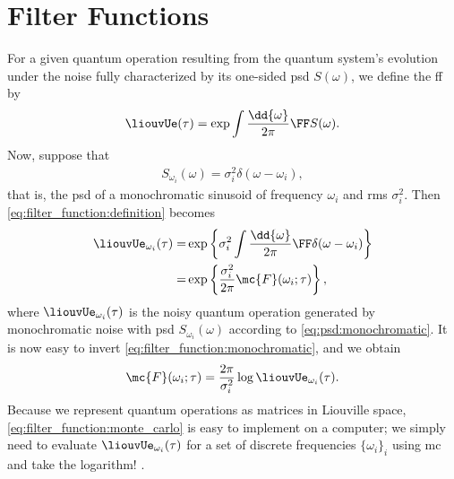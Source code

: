 \chapter{Filter Functions}\label{ch:filter_functions}
For a {\color{RWTHmagenta75} given} quantum operation \liouvUe resulting from the quantum system's evolution under the noise fully characterized by its one-sided \gls{psd} $S(\omega)$, we define the \gls{ff} \FF by
\begin{align}
    \label{eq:filter_function:definition}
    \liouvUe(\tau) = \exp\int\frac{\dd{\omega}}{2\pi}\FF S(\omega).
\end{align}
Now, suppose that
\begin{align}
    \label{eq:psd:monochromatic}
    S_{\omega_i}(\omega) = \sigma_i^2 \delta(\omega - \omega_i), %
\end{align}
that is, the \gls{psd} of a monochromatic sinusoid of frequency $\omega_i$ and \gls{rms} $\sigma_i^2$. %
Then \cref{eq:filter_function:definition} becomes
\begin{equation}
    \label{eq:filter_function:monochromatic}
    \begin{split}
        \liouvUe_{\omega_i}(\tau) =& \exp\left\lbrace\sigma_i^2\int\frac{\dd{\omega}}{2\pi}\FF\delta(\omega - \omega_i)\right\rbrace \\
                             =& \exp\left\lbrace\frac{\sigma_i^2}{2\pi}\mc{F}(\omega_i;\tau)\right\rbrace,
    \end{split}
\end{equation}
where $\liouvUe_{\omega_i}(\tau)$ is the noisy quantum operation generated by monochromatic noise with \gls{psd} $S_{\omega_i}(\omega)$ according to \cref{eq:psd:monochromatic}.
It is now easy to invert \cref{eq:filter_function:monochromatic}, and we obtain
\begin{align}
    \label{eq:filter_function:monte_carlo}
    \mc{F}(\omega_i; \tau) = \frac{2\pi}{\sigma_i^2}\log\liouvUe_{\omega_i}(\tau).
\end{align}
Because we represent quantum operations as matrices in Liouville space, \cref{eq:filter_function:monte_carlo} is easy to implement on a computer; we simply need to evaluate $\liouvUe_{\omega_i}(\tau)$ for a set of discrete frequencies $\lbrace\omega_i\rbrace_i$ using \gls{mc} and take the logarithm! \cite{Geck2021}.%

